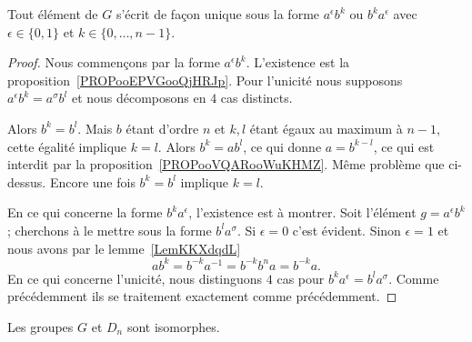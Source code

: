 \begin{lemma}        \label{LemooNFRIooPWuikH}
	Tout élément de \( G\) s'écrit de façon unique sous la forme \( a^{\epsilon}b^k\) ou \( b^ka^{\epsilon}\) avec \( \epsilon\in\{ 0,1 \}\) et \( k\in\{ 0,\ldots, n-1 \}\).
\end{lemma}

\begin{proof}
	Nous commençons par la forme \( a^{\epsilon}b^k\). L'existence est la proposition~\ref{PROPooEPVGooQjHRJp}. Pour l'unicité nous supposons \( a^{\epsilon}b^k=a^{\sigma}b^l\) et nous décomposons en \( 4\) cas distincts.
	\begin{subproof}
		\spitem[\( \epsilon=0\), \( \sigma=0\)]
		Alors \( b^k=b^l\). Mais \( b\) étant d'ordre \( n\) et \( k,l\) étant égaux au maximum à \( n-1\), cette égalité implique \( k=l\).
		\spitem[\( \epsilon=0\), \( \sigma=1\)]
		Alors \( b^k=ab^l\), ce qui donne \( a=b^{k-l}\), ce qui est interdit par la proposition~\ref{PROPooVQARooWuKHMZ}.
		\spitem[\( \epsilon=1\), \( \sigma=0\)]
		Même problème que ci-dessus.
		\spitem[\( \epsilon=1\), \( \sigma=1\)]
		Encore une fois \( b^k=b^l\) implique \( k=l\).
	\end{subproof}
	En ce qui concerne la forme \( b^ka^{\epsilon}\), l'existence est à montrer. Soit l'élément \( g=a^{\epsilon}b^k\); cherchons à le mettre sous la forme \( b^la^{\sigma}\). Si \( \epsilon=0\) c'est évident. Sinon \( \epsilon=1\) et nous avons par le lemme~\ref{LemKKXdqdL}
	\begin{equation}
		ab^k=b^{-k}a^{-1}=b^{-k}b^na=b^{-k}a.
	\end{equation}
	En ce qui concerne l'unicité, nous distinguons \( 4\) cas pour \( b^ka^{\epsilon}=b^la^{\sigma}\). Comme précédemment ils se traitement exactement comme précédemment.
\end{proof}

\begin{theorem}     \label{THOooYITHooTNTBuG}
	Les groupes \( G\) et \( D_n\) sont isomorphes.
\end{theorem}

